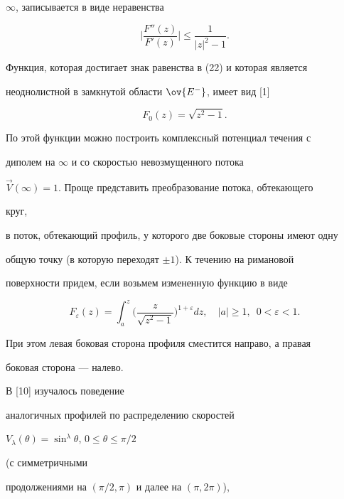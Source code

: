 $\infty$, записывается в виде неравенства 


\begin{equation} 


\bigg|\frac{F''(z)}{F'(z)}\bigg|\le 


\frac{1}{|z|^2-1}. 


\end{equation} 


Функция, которая достигает знак равенства в (22) и которая является 


неоднолистной в замкнутой области $\ov{E^-}$, имеет вид [1] 


$$ 


F_0(z)=\sqrt{z^2-1}. 


$$ 


По этой функции можно построить комплексный потенциал течения с 


диполем на $\infty$ и со скоростью невозмущенного потока 


$\Vec V(\infty)=1$. Проще представить преобразование потока, обтекающего 


круг, 


в поток, обтекающий профиль, у которого две боковые стороны имеют одну 


общую точку (в которую переходят $\pm1$). К течению на римановой 


поверхности придем, если возьмем измененную функцию в виде 


\begin{equation} 


F_\varepsilon(z)=\int^z_a\bigg( 


\frac{z}{\sqrt{z^2-1}}\bigg)^{1+\varepsilon}dz,\quad 


|a|\ge 1,\ \; 0<\varepsilon<1. 


\end{equation} 


При этом левая боковая сторона профиля сместится направо, а правая 


боковая сторона --- налево. 


 


В [10] изучалось поведение 


аналогичных профилей по распределению скоростей 


$V_\lambda(\theta)=\sin^\lambda\theta$, $0\le\theta\le\pi/2$ 


(с симметричными 


продолжениями на $(\pi/2,\pi)$ и далее на $(\pi,2\pi)$), 


